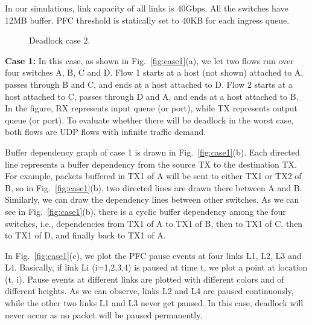  In our simulations, link capacity of all links is 40Gbps. All the switches have 12MB buffer. PFC threshold is statically set to 40KB for each ingress queue.


\begin{figure}[t]
\centering



\caption{Deadlock case 2.}\label{fig:case2}

\end{figure}

\textbf{Case 1:} In this case, as shown in Fig.~\ref{fig:case1}(a), we let two flows run over four switches A, B, C and D. Flow 1 starts at a host (not shown) attached to A, passes through B and C, and ends at a host attached to D. Flow 2 starts at a host attached to C, passes through D and A, and ends at a host attached to B. In the figure, RX represents input queue (or port), while TX represents output queue (or port). To evaluate whether there will be deadlock in the worst case, both flows are UDP flows with infinite traffic demand.

Buffer dependency graph of case 1 is drawn in Fig.~\ref{fig:case1}(b). Each directed line represents a buffer dependency from the source TX to the destination TX. For example, packets buffered in TX1 of A will be sent to either TX1 or TX2 of B, so in Fig.~\ref{fig:case1}(b), two directed lines are drawn there between A and B. Similarly, we can draw the dependency lines between other switches. As we can see in Fig.~\ref{fig:case1}(b), there is a cyclic buffer dependency among the four switches, i.e., dependencies from TX1 of A to TX1 of B, then to TX1 of C, then to TX1 of D, and finally back to TX1 of A.

In Fig.~\ref{fig:case1}(c), we plot the PFC pause events at four links L1, L2, L3 and L4. Basically, if link Li (i=1,2,3,4) is paused at time t, we plot a point at location (t, i). Pause events at different links are plotted with different colors and of different heights. As we can observe, links L2 and L4 are paused continuously, while the other two links L1 and L3 never get paused. In this case, deadlock will never occur as no packet will be paused permanently.


